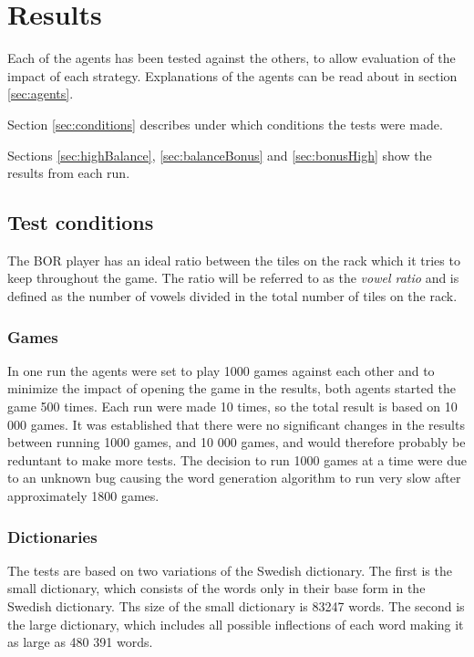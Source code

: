 \documentclass[a4paper, 12pt]{report}
\begin{document}
\chapter{Results}
\label{sec:analysis}
Each of the agents has been tested against the others, to allow evaluation of the impact of each strategy. Explanations of the agents can be read about in section \ref{sec:agents}. 

Section \ref{sec:conditions} describes under which conditions the tests were made.

Sections \ref{sec:highBalance}, \ref{sec:balanceBonus} and \ref{sec:bonusHigh} show the results from each run.
 
\section{Test conditions}
The BOR player has an ideal ratio between the tiles on the rack which it tries to keep throughout the game. The ratio will be referred to as the \emph{vowel ratio} and is defined as the number of vowels divided in the total number of tiles on the rack.

\label{sec:conditions}
\subsection{Games}
In one run the agents were set to play 1000 games against each other and to minimize the impact of opening the game in the results, both agents started the game 500 times. Each run were made 10 times, so the total result is based on 10 000 games. It was established that there were no significant changes in the results between running 1000 games, and 10 000 games, and would therefore probably be reduntant to make more tests. The decision to run 1000 games at a time were due to an unknown bug causing the word generation algorithm to run very slow after approximately 1800 games.

\subsection{Dictionaries}

The tests are based on two variations of the Swedish dictionary. The first is the small dictionary, which consists of the words only in their base form in the Swedish dictionary. Ths size of the small dictionary is 83247 words. The second is the large dictionary, which includes all possible inflections of each word making it as large as 480 391 words.
\end{document}
